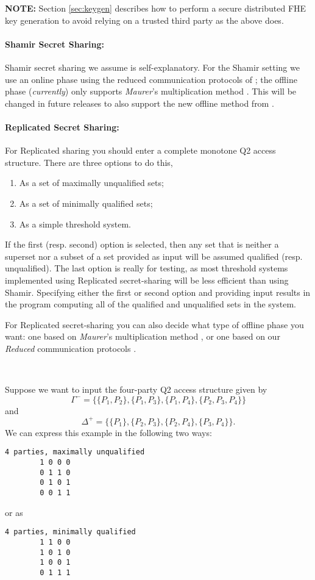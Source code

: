 \textbf{NOTE:} Section \ref{sec:keygen} describes how to perform a secure distributed 
FHE key generation to avoid relying on a trusted third party as the above does.

\iffalse XXXX
For the case of fake offline we assume these keys are on {\em each} computer,
but using fake offline is only for test purposes in any case.
\fi

\paragraph{Shamir Secret Sharing:}
Shamir secret sharing we assume is self-explanatory.
For the Shamir setting we use an online phase using the reduced communication
protocols of \cite{KRSW};
the offline phase ({\em currently}) only supports {\em Maurer}'s multiplication method
\cite{Maurer}.
This will be changed in future releases to also support the new offline method from
\cite{SW18}.


\paragraph{Replicated Secret Sharing:}
For Replicated sharing you should enter a complete monotone Q2 access structure.
There are three options to do this,
\begin{enumerate}
\item As a set of maximally unqualified sets;
\item As a set of minimally qualified sets;
\item As a simple threshold system.
\end{enumerate}
If the first (resp. second) option is selected, then any set that is neither
a superset nor a subset of a set provided as input will be assumed qualified (resp. unqualified).
The last option is really for testing, as most
threshold systems implemented using Replicated secret-sharing will be
less efficient than using Shamir.
Specifying either the first or second option and providing input
results in the program computing all of the qualified and unqualified
sets in the system.

For Replicated secret-sharing you
can also decide what type of offline phase you want: one based on
{\em Maurer}'s multiplication method \cite{Maurer},
or one based on our {\em Reduced} communication protocols \cite{KRSW}.

~~

\noindent
Suppose we want to input the four-party Q2 access structure given by
\[\Gamma^- = \{\{P_1, P_2\}, \{P_1, P_3\}, \{P_1, P_4\}, \{P_2, P_3, P_4\}\}\]
and
\[\Delta^+ = \{\{P_1\}, \{P_2, P_3\}, \{P_2, P_4\}, \{P_3, P_4\}\}.\]
We can express this example in the following two ways:
\begin{verbatim}
4 parties, maximally unqualified
        1 0 0 0
        0 1 1 0
        0 1 0 1
        0 0 1 1
\end{verbatim}
or as
\begin{verbatim}
4 parties, minimally qualified
        1 1 0 0
        1 0 1 0
        1 0 0 1
        0 1 1 1
\end{verbatim}

